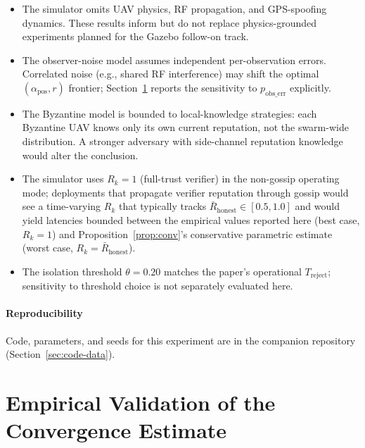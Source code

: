\documentclass[journal,10pt,twocolumn]{IEEEtran}
\begin{document}
\begin{itemize}
  \item The simulator omits UAV physics, RF propagation, and
    GPS-spoofing dynamics. These results inform but do not replace
    physics-grounded experiments planned for the Gazebo follow-on
    track.
  \item The observer-noise model assumes independent per-observation
    errors. Correlated noise (e.g., shared RF interference) may shift
    the optimal $(\alpha_\text{pos}, r)$ frontier;
    Section~\ref{sec:clamp-convergence-empirical} reports the
    sensitivity to $p_\text{obs\_err}$ explicitly.
  \item The Byzantine model is bounded to local-knowledge strategies:
    each Byzantine UAV knows only its own current reputation, not
    the swarm-wide distribution. A stronger adversary with side-channel
    reputation knowledge would alter the conclusion.
  \item The simulator uses $R_k=1$ (full-trust verifier) in the
    non-gossip operating mode; deployments that propagate verifier
    reputation through gossip would see a time-varying $R_k$ that
    typically tracks $\bar{R}_\text{honest}\in[0.5,1.0]$ and would
    yield latencies bounded between the empirical values reported
    here (best case, $R_k=1$) and Proposition~\ref{prop:conv}'s
    conservative parametric estimate (worst case,
    $R_k=\bar{R}_\text{honest}$).
  \item The isolation threshold $\theta=0.20$ matches the paper's
    operational $T_\text{reject}$; sensitivity to threshold choice
    is not separately evaluated here.
\end{itemize}

\paragraph{Reproducibility}
Code, parameters, and seeds for this experiment are in the
companion repository (Section~\ref{sec:code-data}).


\section{Empirical Validation of the Convergence Estimate}
\label{sec:clamp-convergence-empirical}
\end{document}

